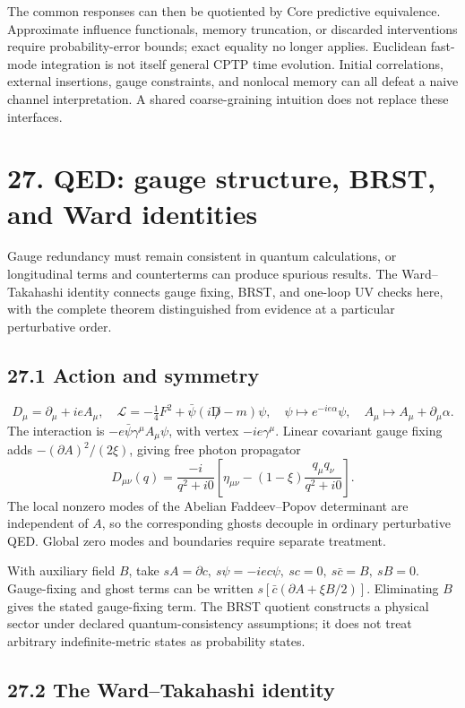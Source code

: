 \documentclass[
  11pt,
  oneside]{book}
\begin{document}
The common responses can then be quotiented by Core predictive
equivalence. Approximate influence functionals, memory truncation, or
discarded interventions require probability-error bounds; exact equality
no longer applies. Euclidean fast-mode integration is not itself general
CPTP time evolution. Initial correlations, external insertions, gauge
constraints, and nonlocal memory can all defeat a naive channel
interpretation. A shared coarse-graining intuition does not replace
these interfaces.

\chapter{27. QED: gauge structure, BRST, and Ward
identities}\label{ch-27}

Gauge redundancy must remain consistent in quantum calculations, or
longitudinal terms and counterterms can produce spurious results. The
Ward--Takahashi identity connects gauge fixing, BRST, and one-loop UV
checks here, with the complete theorem distinguished from evidence at a
particular perturbative order.

\section{27.1 Action and symmetry}

\[
D_\mu=\partial_\mu+ieA_\mu,\quad
\mathcal L=-\tfrac14F^2+\bar\psi(i\not D-m)\psi,
\quad \psi\mapsto e^{-ie\alpha}\psi,\quad A_\mu\mapsto A_\mu+\partial_\mu\alpha.
\] The interaction is \(-e\bar\psi\gamma^\mu A_\mu\psi\), with vertex
\(-ie\gamma^\mu\). Linear covariant gauge fixing adds
\(-(\partial A)^2/(2\xi)\), giving free photon propagator \[
D_{\mu\nu}(q)=\frac{-i}{q^2+i0}
\left[\eta_{\mu\nu}-(1-\xi)\frac{q_\mu q_\nu}{q^2+i0}\right].
\] The local nonzero modes of the Abelian Faddeev--Popov determinant are
independent of \(A\), so the corresponding ghosts decouple in ordinary
perturbative QED. Global zero modes and boundaries require separate
treatment.

With auxiliary field \(B\), take
\(sA=\partial c,\ s\psi=-iec\psi,\ sc=0,\ s\bar c=B,\ sB=0\).
Gauge-fixing and ghost terms can be written
\(s[\bar c(\partial A+\xi B/2)]\). Eliminating \(B\) gives the stated
gauge-fixing term. The BRST quotient constructs a physical sector under
declared quantum-consistency assumptions; it does not treat arbitrary
indefinite-metric states as probability states.

\section{27.2 The Ward--Takahashi identity}
\end{document}
